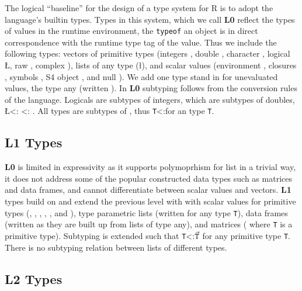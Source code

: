 \documentclass[acmsmall,10pt,review,anonymous]{acmart}\settopmatter{printfolios=true,printccs=false,printacmref=false}
\newcommand{\code}[1]{\lstinline|#1|\xspace}
\begin{document}
The logical ``baseline'' for the design of a type system for R is to adopt
the language's builtin types.  Types in this system, which we call {\bf L0}
reflect the types of values in the runtime environment, the \code{typeof} an
object is in direct correspondence with the runtime type tag of the value.
Thus we include the following types: vectors of primitive types (integers
\I, double \D, character \C, logical \L, raw \R, complex \X), lists of any
type (\l), and scalar values (environment \sE, closures \sF, symbols \sY, S4
object \sS, and null \sN). We add one type stand in for unevaluated values,
the type any (written \ANY). In {\bf L0} subtyping follows from the
conversion rules of the language.  Logicals are subtypes of integers, which
are subtypes of doubles, \L <: \I <: \D.  All types are subtypes of \ANY,
thus {\tt T}<:\ANY for an type {\tt T}.

%
%
\subsection{L1 Types}

{\bf L0} is limited in expressivity as it supports polymoprhism for list in
a trivial way, it does not address some of the popular constructed data
types such as matrices and data frames, and cannot differentiate between
scalar values and vectors.  {\bf L1} types build on and extend the previous
level with with scalar values for primitive types (\sI, \sD, \sC, \sL, \sR,
and \sX), type parametric lists (written  for any type {\tt T}), data
frames (written  as they are built up from lists of type any),
and matrices ( where {\tt T} is a primitive type).
Subtyping is extended such that {\tt T}<:{$\vec{\tt T}$} for any primitive
type {\tt T}. There is no subtyping relation between lists of different
types.

\subsection{L2 Types}
\end{document}
